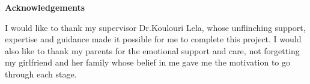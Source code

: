 \mbox{}\newline\vspace{10mm} \mbox{}\LARGE
%
{\bf Acknowledgements} \normalsize \vspace{5mm}

I would like to thank my supervisor Dr.Koulouri Lela, whose unflinching support, expertise and guidance made it possible for me to complete this project. I would also like to thank my parents for the emotional support and care, not forgetting my girlfriend and her family whose belief in me gave me the motivation to go through each stage.
